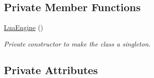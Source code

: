 \subsection*{Private Member Functions}
\begin{DoxyCompactItemize}
\item 
\hyperlink{class_lua_engine_a165d91bae4bef0670afd6f73a3e7e6a7}{Lua\-Engine} ()
\begin{DoxyCompactList}\small\item\em Private constructor to make the class a singleton. \end{DoxyCompactList}\end{DoxyCompactItemize}
\subsection*{Private Attributes}
